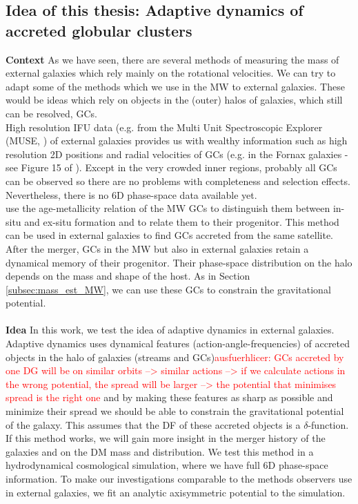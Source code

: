 \subsection{Idea of this thesis: Adaptive dynamics of accreted globular clusters}
\textbf{Context}
As we have seen, there are several methods of measuring the mass of external galaxies which rely mainly on the rotational velocities. We can try to adapt some of the methods which we use in the \ac{MW} to external galaxies. These would be ideas which rely on objects in the (outer) halos of galaxies, which still can be resolved, \acp{GC}. 
\\
High resolution \ac{IFU} data (e.g. from the Multi Unit Spectroscopic Explorer (MUSE, \citealp{Bacon...MUSE...2010}) of external galaxies provides us with wealthy information such as high resolution 2D positions and radial velocities of \acp{GC} (e.g. in the Fornax galaxies - see Figure 15 of \citealp{Sarzi...Fornax3d....2018}). Except in the very crowded inner regions, probably all \acp{GC} can be observed so there are no problems with completeness and selection effects. Nevertheless, there is no 6D phase-space data available yet. 
\\
\citet{Leaman...agemetall.MWGCs...2013} use the age-metallicity relation of the \ac{MW} \acp{GC} to distinguish them between in-situ and ex-situ formation and to relate them to their progenitor. This method can be used in external galaxies to find \acp{GC} accreted from the same satellite.
\\
After the merger, \acp{GC} in the \ac{MW} but also in external galaxies retain a dynamical memory of their progenitor. Their phase-space distribution on the halo depends on the mass and shape of the host. As in Section \ref{subsec:mass_est_MW}, we can use these \acp{GC} to constrain the gravitational potential.
\\\\
\textbf{Idea}
In this work, we test the idea of adaptive dynamics \citep{Binney...adaptivedynamics...2005} in external galaxies. Adaptive dynamics uses dynamical features (action-angle-frequencies) of accreted objects in the halo of galaxies (streams and \acp{GC})\textcolor{red}{ausfuerhlicer: GCs accreted by one DG will be on similar orbits --> similar actions --> if we calculate actions in the wrong potential, the spread will be larger --> the potential that minimises spread is the right one} and by making these features as sharp as possible and minimize their spread we should be able to constrain the gravitational potential of the galaxy. This assumes that the \ac{DF} of these accreted objects is a $\delta$-function. If this method works, we will gain more insight in the merger history of the galaxies and on the \ac{DM} mass and distribution. We test this method in a hydrodynamical cosmological simulation, where we have full 6D phase-space information. To make our investigations comparable to the methods observers use in external galaxies, we fit an analytic axisymmetric potential to the simulation.
